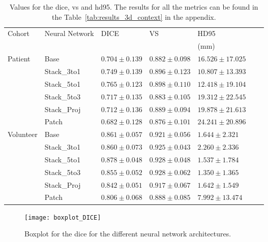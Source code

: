 \begin{table}[htbp]
   \centering
   \caption[Results for 3D Context]{Values for the \acrlong{dice}, \acrlong{vs} and \acrlong{hd95}. The results for all the metrics can be found in the Table~\ref{tab:results_3d_context} in the appendix.}
   \begin{tabular}{l*{6}{l}}
      \toprule
      Cohort	& Neural Network	& DICE				& VS				& HD95\\
      			&					&					&					& (mm)\\
      \midrule
      Patient   & Base  & $0.704 \pm 0.139$ & $0.882 \pm 0.098$ & $16.526 \pm 17.025$ \\
                & Stack\_3to1  & $0.749 \pm 0.139$ & $0.896 \pm 0.123$ & $\mathbf{10.807 \pm 13.393}$ \\
                & Stack\_5to1  & $\mathbf{0.765 \pm 0.123}$ & $\mathbf{0.898 \pm 0.110}$ & $12.418 \pm 19.104$ \\
                & Stack\_5to3  & $0.717 \pm 0.135$ & $0.883 \pm 0.105$ & $19.312 \pm 22.545$ \\
                & Stack\_Proj  & $0.712 \pm 0.136$ & $0.889 \pm 0.094$ & $19.878 \pm 21.613$ \\
                & Patch & $0.682 \pm 0.128$ & $0.876 \pm 0.101$ & $24.241 \pm 20.896$ \\                
      \midrule
      Volunteer & Base  & $0.861 \pm 0.057$ & $0.921 \pm 0.056$ & $1.644  \pm 2.321 $ \\
                & Stack\_3to1  & $0.860 \pm 0.073$ & $0.925 \pm 0.043$ & $2.260  \pm 2.336 $ \\
                & Stack\_5to1  & $\mathbf{0.878 \pm 0.048}$ & $\mathbf{0.928 \pm 0.048}$ & $1.537  \pm 1.784 $ \\
                & Stack\_5to3  & $0.855 \pm 0.052$ & $0.928 \pm 0.062$ & $\mathbf{1.350  \pm 1.365} $ \\                
                & Stack\_Proj  & $0.842 \pm 0.051$ & $0.917 \pm 0.067$ & $1.642  \pm 1.549 $ \\
                & Patch & $0.806 \pm 0.068$ & $0.888 \pm 0.085$ & $7.992  \pm 13.474$ \\
      \bottomrule
   \end{tabular}
   \label{tab:results_3d_context_small}
\end{table}

\begin{figure}[htbp]
	\centering
	\texttt{[image: boxplot\_DICE]}
    \caption[Boxplot for the \acrlong{dice} for 3D Context]{Boxplot for the \acrlong{dice} for the different neural network architectures.}
    \label{fig:results_boxplot_dice}
\end{figure}

